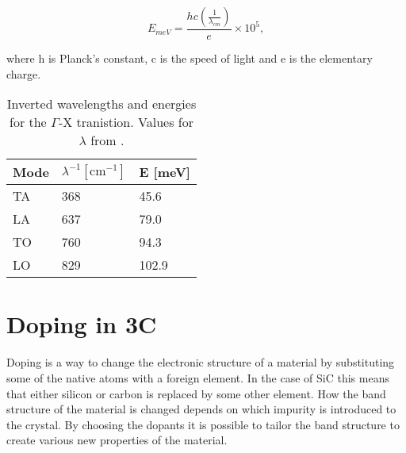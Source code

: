 \[E_{meV} = \frac{hc(\frac{1}{\lambda_{cm}})}{e}\times 10^5,\]

\noindent where h is Planck's constant, c is the speed of light and e is the elementary charge. 

\begin{table}[h]
\caption{Inverted wavelengths and energies for the $\Gamma$-X tranistion. Values for $\lambda$ from \cite{Karch1994}.}
\label{tab:phonons}
\begin{center}
\begin{tabular}{ l l l }
  \hline                       
  \hline       
  \vspace{1mm}
    Mode  & $\lambda^{-1} [\mathrm{cm}^{-1}]$  & E [meV]\\
    \hline
  TA &  368 & 45.6\\
  LA &  637 & 79.0\\
  TO &  760 & 94.3\\
  LO &  829 & 102.9\\
  \hline  
\end{tabular}
\end{center}
\end{table}









\section{Doping in 3C}
\label{sec:doping_in_3C}

	


Doping is a way to change the electronic structure of a material by substituting some of the native atoms with a foreign element. In the case of SiC this means that either silicon or carbon is replaced by some other element. How the band structure of the material is changed depends on which impurity is introduced to the crystal. By choosing the dopants it is possible to tailor the band structure to create various new properties of the material. 

